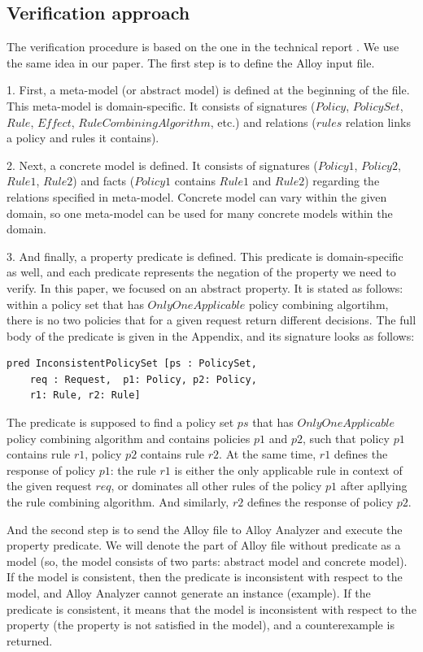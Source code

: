 \documentclass{acm_proc_article-sp}
\begin{document}
\subsection{Verification approach}

The verification procedure is based on the one in the technical report \cite{acp:alloy}. We use the same idea in our paper.
The first step is to define the Alloy input file.

1. First, a meta-model (or abstract model) is defined at the beginning of the file. This meta-model is domain-specific. It consists of signatures ($Policy$, $PolicySet$, $Rule$, $Effect$, $RuleCombiningAlgorithm$, etc.) and relations ($rules$ relation links a policy and rules it contains).

2. Next, a concrete model is defined. It consists of signatures ($Policy1$, $Policy2$, $Rule1$, $Rule2$) and facts ($Policy1$ contains $Rule1$ and $Rule2$) regarding the relations specified in meta-model. Concrete model can vary within the given domain, so one meta-model can be used for many concrete models within the domain.

3. And finally, a property predicate is defined. This predicate is domain-specific as well, and each predicate represents the negation of the property we need to verify. In this paper, we focused on an abstract property. It is stated as follows: within a policy set that has $OnlyOneApplicable$ policy combining algortihm, there is no two policies that for a given request return different decisions. The full body of the predicate is given in the Appendix, and its signature looks as follows:

\begin{verbatim}
pred InconsistentPolicySet [ps : PolicySet, 
    req : Request,  p1: Policy, p2: Policy, 
    r1: Rule, r2: Rule]
\end{verbatim}

The predicate is supposed to find a policy set $ps$ that has $OnlyOneApplicable$ policy combining algorithm and contains policies $p1$ and $p2$, such that policy $p1$ contains rule $r1$, policy $p2$ contains rule $r2$. At the same time, $r1$ defines the response of policy $p1$: the rule $ r1$ is either the only applicable rule in context of the given request $req$, or dominates all other rules of the policy $p1$ after apllying the rule combining algorithm. And similarly, $r2$ defines the response of policy $p2$.

And the second step is to send the Alloy file to Alloy Analyzer and execute the property predicate. We will denote the part of Alloy file without predicate as a model (so, the model consists of two parts: abstract model and concrete model). If the model is consistent, then the predicate is inconsistent with respect to the model, and Alloy Analyzer cannot generate an instance (example). If the predicate is consistent, it means that the model is inconsistent with respect to the property (the property is not satisfied in the model), and a counterexample is returned.
\end{document}
